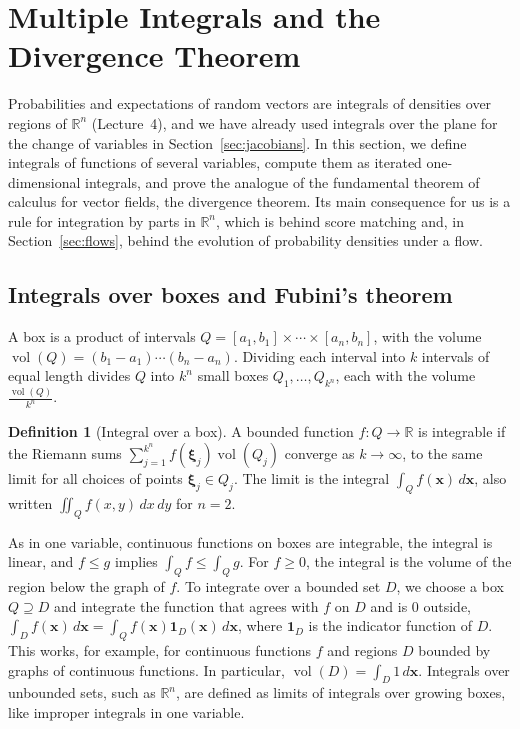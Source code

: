 \documentclass[11pt]{article}
\theoremstyle{definition}
\newtheorem{definition}{Definition}[section]
\theoremstyle{plain}
\theoremstyle{remark}
\DeclareMathOperator{\vol}{vol}
\begin{document}
\section{Multiple Integrals and the Divergence Theorem}\label{sec:integrals}

Probabilities and expectations of random vectors are integrals of densities over regions of $\mathbb{R}^n$ (Lecture~4), and we have already used integrals over the plane for the change of variables in Section~\ref{sec:jacobians}. In this section, we define integrals of functions of several variables, compute them as iterated one-dimensional integrals, and prove the analogue of the fundamental theorem of calculus for vector fields, the divergence theorem. Its main consequence for us is a rule for integration by parts in $\mathbb{R}^n$, which is behind score matching and, in Section~\ref{sec:flows}, behind the evolution of probability densities under a flow.

\subsection{Integrals over boxes and Fubini's theorem}

A box is a product of intervals $Q = [a_1, b_1] \times \cdots \times [a_n, b_n]$, with the volume $\vol(Q) = (b_1 - a_1)\cdots(b_n - a_n)$. Dividing each interval into $k$ intervals of equal length divides $Q$ into $k^n$ small boxes $Q_1, \ldots, Q_{k^n}$, each with the volume $\frac{\vol(Q)}{k^n}$.

\begin{definition}[Integral over a box]\label{def:multiple-integral}
    A bounded function $f: Q \to \mathbb{R}$ is integrable if the Riemann sums $\sum_{j=1}^{k^n} f(\boldsymbol{\xi}_j)\vol(Q_j)$ converge as $k \to \infty$, to the same limit for all choices of points $\boldsymbol{\xi}_j \in Q_j$. The limit is the integral $\int_Q f(\mathbf{x})\, d\mathbf{x}$, also written $\iint_Q f(x, y)\, dx\, dy$ for $n = 2$.
\end{definition}

As in one variable, continuous functions on boxes are integrable, the integral is linear, and $f \leq g$ implies $\int_Q f \leq \int_Q g$. For $f \geq 0$, the integral is the volume of the region below the graph of $f$. To integrate over a bounded set $D$, we choose a box $Q \supseteq D$ and integrate the function that agrees with $f$ on $D$ and is $0$ outside, $\int_D f(\mathbf{x})\, d\mathbf{x} = \int_Q f(\mathbf{x})\mathbf{1}_D(\mathbf{x})\, d\mathbf{x}$, where $\mathbf{1}_D$ is the indicator function of $D$. This works, for example, for continuous functions $f$ and regions $D$ bounded by graphs of continuous functions. In particular, $\vol(D) = \int_D 1\, d\mathbf{x}$. Integrals over unbounded sets, such as $\mathbb{R}^n$, are defined as limits of integrals over growing boxes, like improper integrals in one variable.
\end{document}
